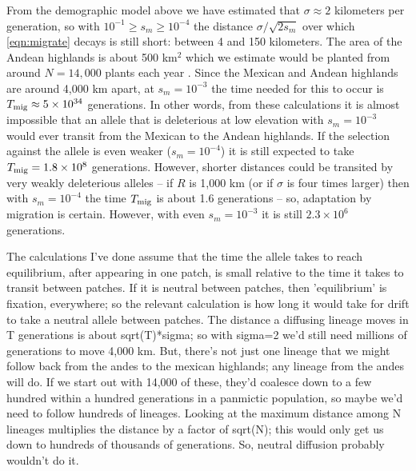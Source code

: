 {{%

From the demographic model above
we have estimated that $\sigma \approx 2$ kilometers per generation,
so with $10^{-1} \ge s_m \ge 10^{-4}$ the distance $\sigma/\sqrt{2s_m}$ over which \eqref{eqn:migrate} decays 
is still short: between 4 and 150 kilometers.
The area of the Andean highlands is about 500 km$^2$ 
which we estimate would be planted from around $N=14,000$ plants each year .
Since the Mexican and Andean highlands are around 4,000 km apart,
at $s_m=10^{-3}$ the time needed for this to occur is $T_{\text{mig}} \approx 5 \times 10^{34}$ generations.
In other words, from these calculations it is almost impossible that an allele that is deleterious at low elevation with $s_m=10^{-3}$ 
would ever transit from the Mexican to the Andean highlands.
If the selection against the allele is even weaker ($s_m=10^{-4}$) it is still expected to take $T_{\text{mig}} = 1.8 \times 10^8$ generations.
However, shorter distances could be transited by very weakly deleterious alleles --
if $R$ is 1,000 km (or if $\sigma$ is four times larger)
then with $s_m=10^{-4}$ the time $T_{\text{mig}}$ is about 1.6 generations --
so, adaptation by migration is certain.
However, with even $s_m=10^{-3}$ it is still $2.3 \times 10^6$ generations.

The calculations I've done assume that the time the allele takes to reach equilibrium, after appearing in one patch, is small relative to the time it takes to transit between patches.  If it is neutral between patches, then 'equilibrium' is fixation, everywhere; so the relevant calculation is how long it would take for drift to take a neutral allele between patches.  The distance a diffusing lineage moves in T generations is about sqrt(T)*sigma; so with sigma=2 we'd still need millions of generations to move 4,000 km.  But, there's not just one lineage that we might follow back from the andes to the mexican highlands; any lineage from the andes will do.  If we start out with 14,000 of these, they'd coalesce down to a few hundred within a hundred generations in a panmictic population, so maybe we'd need to follow hundreds of lineages.  Looking at the maximum distance among N lineages multiplies the distance by a factor of sqrt(N); this would only get us down to hundreds of thousands of generations.  So, neutral diffusion probably wouldn't do it.

}}
